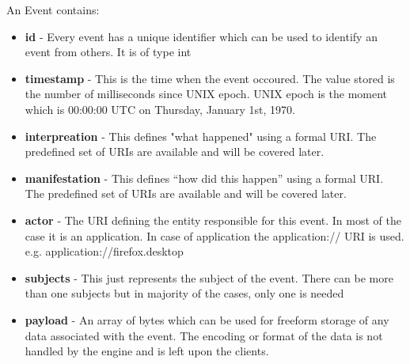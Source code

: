 \noindent
An Event contains:
\begin{itemize}
\item \textbf{id} - Every event has a unique identifier which can be used to identify 
an event from others. It is of type int
\item \textbf{timestamp} - This is the time when the event occoured. The value stored is 
the number of milliseconds since UNIX epoch. UNIX epoch is the moment which is 
00:00:00 UTC on Thursday, January 1st, 1970.
\item \textbf{interpreation} - This defines "what happened" using a formal URI. The 
predefined set of URIs are available and will be covered later.
\item \textbf{manifestation} - This defines “how did this happen” using a formal URI. 
The predefined set of URIs are available and will be covered later.
\item \textbf{actor} - The URI defining the entity responsible for this event. 
In most of the case it is an application. In case of application the 
application:// URI is used. e.g. application://firefox.desktop
\item \textbf{subjects} - This just represents the subject of the event. There can be more 
than one subjects but in majority of the cases, only one is needed
\item \textbf{payload} - An array of bytes which can be used for freeform storage of any 
data associated with the event. The encoding or format of the data is not handled 
by the engine and is left upon the clients.
\end{itemize}


